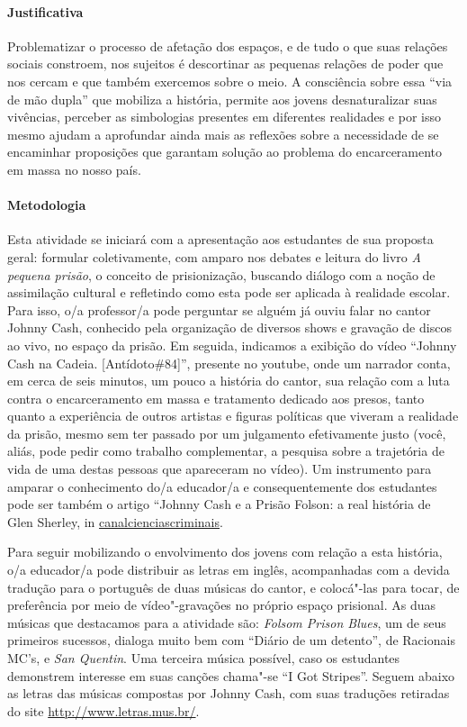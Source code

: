 \documentclass[11pt]{extarticle}
\begin{document}
\paragraph{Justificativa} Problematizar o processo de afetação dos
espaços, e de tudo o que suas relações sociais constroem, nos sujeitos é
descortinar as pequenas relações de poder que nos cercam e que também
exercemos sobre o meio. A consciência sobre essa ``via de mão dupla''
que mobiliza a história, permite aos jovens desnaturalizar suas
vivências, perceber as simbologias presentes em diferentes realidades e
por isso mesmo ajudam a aprofundar ainda mais as reflexões sobre a
necessidade de se encaminhar proposições que garantam solução ao
problema do encarceramento em massa no nosso país.

\paragraph{Metodologia} Esta atividade se iniciará com a apresentação aos
estudantes de sua proposta geral: formular coletivamente, com amparo nos
debates e leitura do livro \emph{A pequena prisão}, o conceito de
prisionização, buscando diálogo com a noção de assimilação cultural e
refletindo como esta pode ser aplicada à realidade escolar. Para isso,
o/a professor/a pode perguntar se alguém já ouviu falar no cantor Johnny
Cash, conhecido pela organização de diversos shows e gravação de discos
ao vivo, no espaço da prisão. Em seguida, indicamos a exibição do vídeo
``Johnny Cash na Cadeia. {[}Antídoto\#84{]}'', presente no youtube, onde
um narrador conta, em cerca de seis minutos, um pouco a história do
cantor, sua relação com a luta contra o encarceramento em massa e
tratamento dedicado aos presos, tanto quanto a experiência de outros
artistas e figuras políticas que viveram a realidade da prisão, mesmo
sem ter passado por um julgamento efetivamente justo (você, aliás, pode
pedir como trabalho complementar, a pesquisa sobre a trajetória de vida
de uma destas pessoas que apareceram no vídeo). Um instrumento para
amparar o conhecimento do/a educador/a e consequentemente dos estudantes
pode ser também o artigo ``Johnny Cash e a Prisão Folson: a real
história de Glen Sherley, in
\href{https://canalcienciascriminais.jusbrasil.com.br/artigos/409579800/johnny-cash-e-a-prisao-folsom-a-real-historia-de-glen-sherley}{canalcienciascriminais}.

Para seguir mobilizando o envolvimento dos jovens com relação a esta
história, o/a educador/a pode distribuir as letras em inglês,
acompanhadas com a devida tradução para o português de duas músicas do
cantor, e colocá"-las para tocar, de preferência por meio de
vídeo"-gravações no próprio espaço prisional. As duas músicas que
destacamos para a atividade são: \emph{Folsom Prison Blues}, um de seus
primeiros sucessos, dialoga muito bem com ``Diário de um detento'', de
Racionais MC's, e \emph{San Quentin}. Uma terceira música possível, caso
os estudantes demonstrem interesse em suas canções chama"-se ``I Got
Stripes''. Seguem abaixo as letras das músicas compostas por Johnny Cash,
com suas traduções retiradas do site
\url{http://www.letras.mus.br/}.
\end{document}
